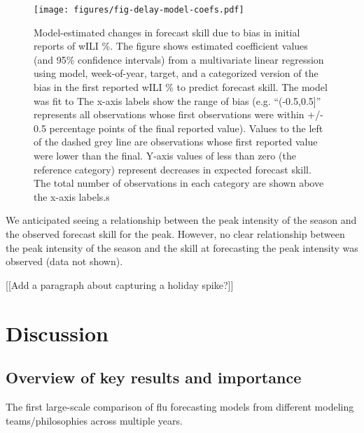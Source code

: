 \documentclass{article}\usepackage[]{graphicx}\usepackage[]{color}
\begin{document}
\begin{figure}[htbp]
\begin{center}
\texttt{[image: figures/fig-delay-model-coefs.pdf]}
\caption{Model-estimated changes in forecast skill due to bias in initial reports of wILI \%. The figure shows estimated coefficient values (and 95\% confidence intervals) from a multivariate linear regression using model, week-of-year, target, and a categorized version of the bias in the first reported wILI \% to predict forecast skill. The model was fit to  The x-axis labels show the range of bias (e.g. ``(-0.5,0.5]'' represents all observations whose first observations were within +/- 0.5 percentage points of the final reported value). Values to the left of the dashed grey line are observations whose first reported value were lower than the final. Y-axis values of less than zero (the reference category) represent decreases in expected forecast skill. The total number of observations in each category are shown above the x-axis labels.s}
\label{fig:delay-model-coefs}
\end{center}
\end{figure}


We anticipated seeing a relationship between the peak intensity of the season and the observed forecast skill for the peak. 
However, no clear relationship between the peak intensity of the season and the skill at forecasting the peak intensity was observed (data not shown).

[[Add a paragraph about capturing a holiday spike?]]



\section{Discussion}

\subsection{Overview of key results and importance}
The first large-scale comparison of flu forecasting models from different modeling teams/philosophies across multiple years.
\end{document}
